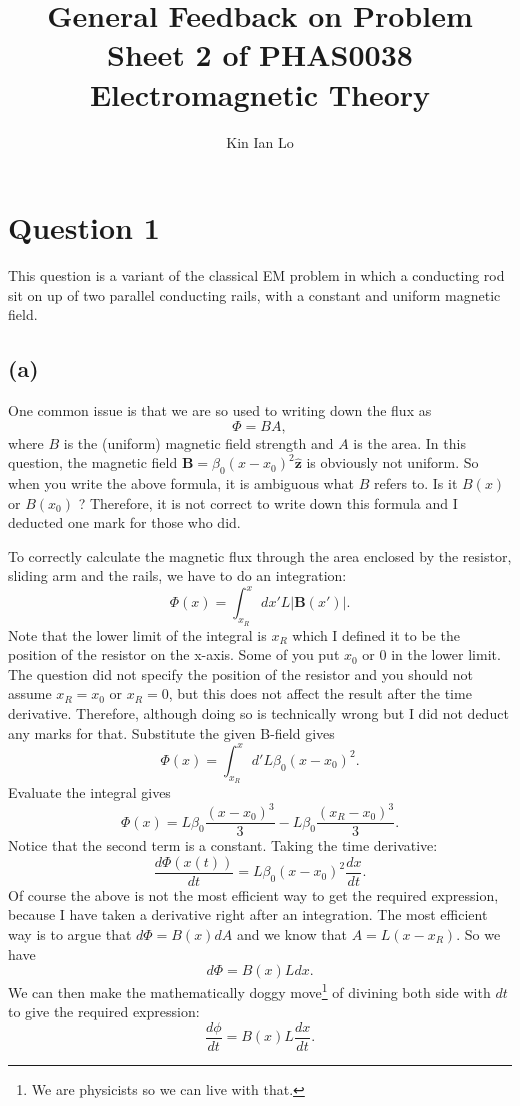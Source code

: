 \documentclass[a4paper]{article}
\title{General Feedback on Problem Sheet 2 of PHAS0038 Electromagnetic Theory}
\author{Kin Ian Lo}
\begin{document}
\maketitle

\section*{Question 1}
\label{sec:question_1}
This question is a variant of the classical EM problem in which a conducting rod sit on up of two parallel conducting rails, with a constant and uniform magnetic field.
\subsection*{(a)}
One common issue is that we are so used to writing down the flux as 
\[
\Phi = B A
,\] 
where $B$ is the (uniform) magnetic field strength and $A$ is the area. In this question, the magnetic field $\mathbf{B} = \beta_0 (x-x_0)^2 \mathbf{\hat{z}}$ is obviously not uniform. So when you write the above formula, it is ambiguous what $B$ refers to. Is it  $B(x)$ or $B(x_0)$ ?
Therefore, it is not correct to write down this formula and I deducted one mark for those who did.

To correctly calculate the magnetic flux through the area enclosed by the resistor, sliding arm and the rails, we have to do an integration:
\[
    \Phi(x) = \int_{x_R}^x dx' L |\mathbf{B}(x')|
.\] 
Note that the lower limit of the integral is $x_R$ which I defined it to be the position of the resistor on the x-axis.
Some of you put $x_0$ or $0$ in the lower limit. The question did not specify the position of the resistor and you should not assume  $x_R = x_0$ or  $x_R = 0$, but this does not affect the result after the time derivative. Therefore, although doing so is technically wrong but I did not deduct any marks for that. 
Substitute the given B-field gives
\[
    \Phi(x) = \int_{x_R}^x d' L \beta_0 (x-x_0)^2
.\] 
Evaluate the integral gives
\[
    \Phi(x) = L \beta_0 \frac{(x-x_0)^3}{3} - L \beta_0 \frac{(x_R-x_0)^3}{3}
.\] 
Notice that the second term is a constant. Taking the time derivative:
\[
    \frac{d\Phi(x(t))}{dt} =  L \beta_0 (x-x_0)^2 \frac{dx}{dt}
.\] 
Of course the above is not the most efficient way to get the required expression, because I have taken a derivative right after an integration. 
The most efficient way is to argue that $d\Phi = B(x) dA$ and we know that $A = L (x - x_R)$. So we have 
\[
    d\Phi = B(x) L dx
.\] 
We can then make the mathematically doggy move\footnote{We are physicists so we can live with that.} of divining both side with $dt$ to give the required expression:
\[
    \frac{d\phi}{dt} = B(x)L \frac{dx}{dt}
.\] 
\end{document}
